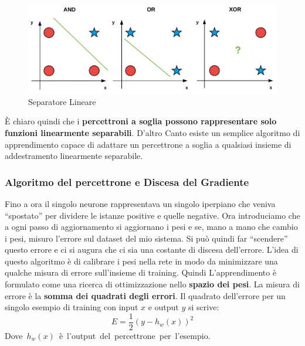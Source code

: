 \begin{figure}[h!]
	\centering
	\includegraphics[width=1\textwidth]{bitwise_datasets-1024x365.png}
	\caption{Separatore Lineare}
	\label{SeparatoreLineare}
\end{figure}
È chiaro quindi che i \textbf{percettroni a soglia possono rappresentare solo funzioni linearmente separabili}. D'altro Canto esiste un semplice algoritmo di apprendimento capace di adattare un percettrone a soglia a qualsiasi insieme di addestramento linearmente separabile.
\subsubsection{Algoritmo del percettrone e Discesa del Gradiente}
Fino a ora il singolo neurone rappresentava un singolo iperpiano che veniva ``spostato'' per dividere le istanze positive e quelle negative. Ora introduciamo che a ogni passo di aggiornamento si aggiornano i pesi e se, mano a mano che cambio i pesi, misuro l'errore sul dataset del mio sistema. Si può quindi far ``scendere'' questo errore e ci si augura che ci sia una costante di discesa dell'errore. L'idea di questo algoritmo è di calibrare i pesi nella rete in modo da minimizzare una qualche misura di errore sull'insieme di training. Quindi L'apprendimento è formulato come una ricerca di ottimizzazione nello \textbf{spazio dei pesi}. La misura di errore è la \textbf{somma dei quadrati degli errori}.
Il quadrato dell'errore per un singolo esempio di training con input $x$ e output $y$ si scrive:
\[E=\frac{1}{2}(y-h_w(x))^2\]\mbox{Dove $h_w(x)$ è l'output del percettrone per l'esempio.}

